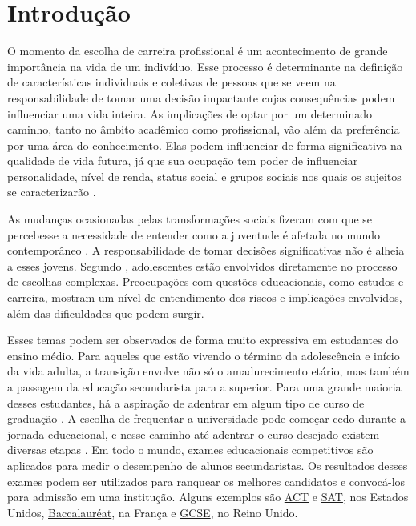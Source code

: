 \chapter{Introdução}

O momento da escolha de carreira profissional é um acontecimento de grande importância na vida de um indivíduo. Esse processo é determinante na definição de características individuais e coletivas de pessoas que se veem na responsabilidade de tomar uma decisão impactante \autocite{AkosahTwumasi2018} cujas consequências podem influenciar uma vida inteira. As implicações de optar por um determinado caminho, tanto no âmbito acadêmico como profissional, vão além da preferência por uma área do conhecimento. Elas podem influenciar de forma significativa na qualidade de vida futura, já que sua ocupação tem poder de influenciar personalidade, nível de renda, status social e grupos sociais nos quais os sujeitos se caracterizarão \autocite{Kazi2017}.

As mudanças ocasionadas pelas transformações sociais fizeram com que se percebesse a necessidade de entender como a juventude é afetada no mundo contemporâneo \autocite{Unesco2006}. A responsabilidade de tomar decisões significativas não é alheia a esses jovens. Segundo \citet{Gati2001}, adolescentes estão envolvidos diretamente no processo de escolhas complexas. Preocupações com questões educacionais, como estudos e carreira, mostram um nível de entendimento dos riscos e implicações envolvidos, além das dificuldades que podem surgir.

Esses temas podem ser observados de forma muito expressiva em estudantes do ensino médio. Para aqueles que estão vivendo o término da adolescência e início da vida adulta, a transição envolve não só o amadurecimento etário, mas também a passagem da educação secundarista para a superior. Para uma grande maioria desses estudantes, há a aspiração de adentrar em algum tipo de curso de graduação \autocite{Venezia2013}. A escolha de frequentar a universidade pode começar cedo durante a jornada educacional, e nesse caminho até adentrar o curso desejado existem diversas etapas \autocite{Cabrera2000}. Em todo o mundo, exames educacionais competitivos são aplicados para medir o desempenho de alunos secundaristas. Os resultados desses exames podem ser utilizados para ranquear os melhores candidatos e convocá-los para admissão em uma institução. Alguns exemplos são \href{https://www.act.org/content/act/en/products-and-services/the-act.html}{ACT} e  \href{https://satsuite.collegeboard.org/sat}{SAT}, nos Estados Unidos, \href{https://www.education.gouv.fr/reussir-au-lycee/le-baccalaureat-general-10457}{Baccalauréat}, na França e \href{https://www.britishcouncil.es/en/exam/professional-university/igcse}{GCSE}, no Reino Unido.

